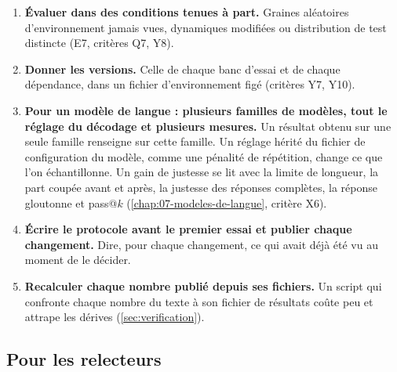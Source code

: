 \begin{enumerate}
  \item \textbf{Évaluer dans des conditions tenues à part.} Graines aléatoires d'environnement
        jamais vues, dynamiques modifiées ou distribution de test distincte (E7, critères Q7, Y8).
  \item \textbf{Donner les versions.} Celle de chaque banc d'essai et de chaque dépendance, dans un
        fichier d'environnement figé (critères Y7, Y10).
  \item \textbf{Pour un modèle de langue : plusieurs familles de modèles, tout le réglage du
        décodage et plusieurs mesures.} Un résultat obtenu sur une seule famille renseigne sur cette
        famille. Un réglage hérité du fichier de configuration du modèle, comme une pénalité de
        répétition, change ce que l'on échantillonne. Un gain de justesse se lit avec la limite de
        longueur, la part coupée avant et après, la justesse des réponses complètes, la réponse
        gloutonne et pass@$k$ (\cref{chap:07-modeles-de-langue}, critère X6).
  \item \textbf{Écrire le protocole avant le premier essai et publier chaque changement.} Dire,
        pour chaque changement, ce qui avait déjà été vu au moment de le décider.
  \item \textbf{Recalculer chaque nombre publié depuis ses fichiers.} Un script qui confronte chaque
        nombre du texte à son fichier de résultats coûte peu et attrape les dérives
        (\cref{sec:verification}).
\end{enumerate}

\subsection{Pour les relecteurs}

